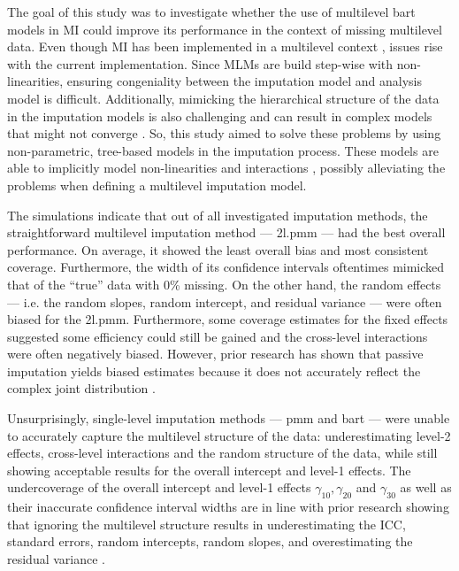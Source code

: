\documentclass[10pt, a4paper, titlepage]{article}
\begin{document}
The goal of this study was to investigate whether the use of multilevel bart models in MI could improve its performance in the context of missing multilevel data. Even though MI has been implemented in a multilevel context \citep{mistlerComparisonJointModel2017, enders2018, enders2018a, enders2020, buurenFlexibleImputationMissing2018, taljaard2008, enders2016, resche-rigon2018, audigier2018, dong2023, grund2016, grund2018a, grund2018, ludtke2017, grund2021, quartagno2022}, issues rise with the current implementation. Since MLMs are build step-wise with non-linearities, ensuring congeniality between the imputation model and analysis model is difficult. Additionally, mimicking the hierarchical structure of the data in the imputation models is also challenging \citep{buurenFlexibleImputationMissing2018, burgette2010, hox2011} and can result in complex models that might not converge \citep{buurenFlexibleImputationMissing2018}. So, this study aimed to solve these problems by using non-parametric, tree-based models in the imputation process. These models are able to implicitly model non-linearities and interactions \citep{hill2020, burgette2010, lin2019, chipman2010, james2021, salditt2023, breiman1984}, possibly alleviating the problems when defining a multilevel imputation model. 

The simulations indicate that out of all investigated imputation methods, the straightforward multilevel imputation method --- 2l.pmm --- had the best overall performance. On average, it showed the least overall bias and most consistent coverage. Furthermore, the width of its confidence intervals oftentimes mimicked that of the ``true'' data with 0\% missing. On the other hand, the random effects --- i.e. the random slopes, random intercept, and residual variance --- were often biased for the 2l.pmm. Furthermore, some coverage estimates for the fixed effects suggested some efficiency could still be gained and the cross-level interactions were often negatively biased. However, prior research has shown that passive imputation yields biased estimates because it does not accurately reflect the complex joint distribution \citep{grund2018,vink2013,seaman2012}.

Unsurprisingly, single-level imputation methods --- pmm and bart --- were unable to accurately capture the multilevel structure of the data: underestimating level-2 effects, cross-level interactions and the random structure of the data, while still showing acceptable results for the overall intercept and level-1 effects. The undercoverage of the overall intercept and level-1 effects $\gamma_{10}, \gamma_{20}$ and $\gamma_{30}$ as well as their inaccurate confidence interval widths are in line with prior research showing that ignoring the multilevel structure results in underestimating the ICC, standard errors, random intercepts, random slopes, and overestimating the residual variance \citep{buurenFlexibleImputationMissing2018, ludtke2017, taljaard2008, hox2011,enders2016}.
\end{document}

